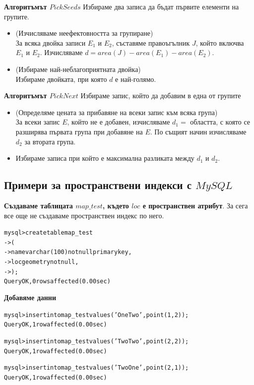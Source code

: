 \documentclass[a4paper,10pt]{article}
\begin{document}
\textbf{Алгоритъмът $PickSeeds$}
Избираме два записа да бъдат първите елементи на групите.
\begin{itemize}
 \item (Изчисляваме неефектовността за групиране) \\
За всяка двойка записи $E_{1}$ и $E_{2}$, съставяме правоъгълник $J$, който включва $E_{1}$ и $E_{2}$. 
Изчисляваме $d = area(J) - area(E_{1}) - area(E_{2})$.
\item (Избираме най-неблагоприятната двойка) \\
Избираме двойката, при която $d$ е най-голямо.
\end{itemize}

\textbf{Алгоритъмът $PickNext$}
Избираме запис, който да добавим в една от групите
\begin{itemize}
 \item (Определяме цената за прибавяне на всеки запис към всяка група) \\
За всеки запис $E$, който не е добавен, изчисляваме $d_{1} = $
областта, с която се разширява първата група при добавяне на $E$. 
По същият начин изчисляваме $d_{2}$ за втората група.
\item Избираме записа при който е максимална разликата  между $d_{1}$ и $d_{2}$.
\end{itemize}



\subsection{Примери за пространствени индекси с $MySQL$}
\textbf{Създаваме таблицата $map\_test$, където $loc$ е пространствен атрибут}. За сега все още не създаваме
пространствен индекс по него.
\begin{alltt}
mysql> create table map_test
    -> (
    ->   name varchar(100) not null primary key,
    ->   loc  geometry not null,
    -> );
Query OK, 0 rows affected (0.00 sec)
\end{alltt}

\textbf{Добавяме данни}
\begin{alltt}
mysql> insert into map_test values ('One Two', point(1,2));
Query OK, 1 row affected (0.00 sec)

mysql> insert into map_test values ('Two Two', point(2,2));
Query OK, 1 row affected (0.00 sec)

mysql> insert into map_test values ('Two One', point(2,1));
Query OK, 1 row affected (0.00 sec)
\end{alltt}
\end{document}
